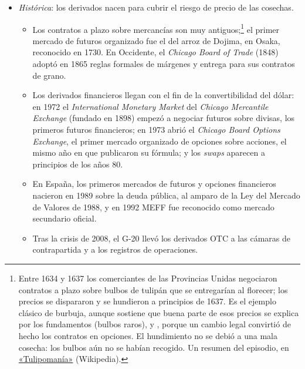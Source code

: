 \documentclass[11pt]{article}
\begin{document}
\begin{itemize}
\begin{itemize}
  \item \emph{Histórica}: los derivados nacen para cubrir el riesgo de precio de las cosechas.
    \begin{itemize}
    \item Los contratos a plazo sobre mercancías son muy antiguos;\footnote{Entre 1634 y 1637 los comerciantes de las Provincias Unidas negociaron contratos a plazo sobre bulbos de tulipán que se entregarían al florecer; los precios se dispararon y se hundieron a principios de 1637. Es el ejemplo clásico de burbuja, aunque \textcite{Garber1990Famous} sostiene que buena parte de esos precios se explica por los fundamentos (bulbos raros), y \textcite{Thompson2007Tulipmania}, porque un cambio legal convirtió de hecho los contratos en opciones. El hundimiento no se debió a una mala cosecha: los bulbos aún no se habían recogido. Un resumen del episodio, en \href{https://es.wikipedia.org/wiki/Tulipoman\%C3\%ADa}{«Tulipomanía»} (Wikipedia).} el primer mercado de futuros organizado fue el del arroz de Dojima, en Osaka, reconocido en 1730\nocite{Schaede1989Forwards}. En Occidente, el \emph{Chicago Board of Trade} (1848) adoptó en 1865 reglas formales de márgenes y entrega para sus contratos de grano\nocite{CFTC2026Historia}.
    \item Los derivados financieros llegan con el fin de la convertibilidad del dólar: en 1972 el \emph{International Monetary Market} del \emph{Chicago Mercantile Exchange} (fundado en 1898) empezó a negociar futuros sobre divisas, los primeros futuros financieros\nocite{Chalupa1982Currency,CFTC2026Historia}; en 1973 abrió el \emph{Chicago Board Options Exchange}, el primer mercado organizado de opciones sobre acciones\nocite{Cboe2020Form10K}, el mismo año en que \textcite{BlackScholes1973Pricing} publicaron su fórmula; y los \emph{swaps} aparecen a principios de los años 80\nocite{Hull2022Options}.
    \item En España, los primeros mercados de futuros y opciones financieros nacieron en 1989 sobre la deuda pública, al amparo de la Ley del Mercado de Valores de 1988, y en 1992 MEFF fue reconocido como mercado secundario oficial\nocite{BOE1992OrdenMEFF}.
    \item Tras la crisis de 2008, el G-20 llevó los derivados OTC a las cámaras de contrapartida y a los registros de operaciones.
    \end{itemize}
  \end{itemize}


\end{itemize}
\end{document}
